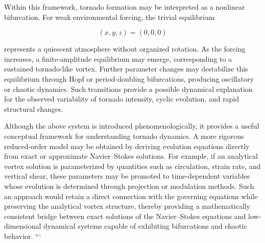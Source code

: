 Within this framework, tornado formation may be interpreted as a nonlinear bifurcation. For weak environmental forcing, the trivial equilibrium

\begin{equation}
(x,y,z)
=
(0,0,0)
\end{equation}

represents a quiescent atmosphere without organized rotation. As the forcing increases, a finite-amplitude equilibrium may emerge, corresponding to a sustained tornado-like vortex. Further parameter changes may destabilize this equilibrium through Hopf or period-doubling bifurcations, producing oscillatory or chaotic dynamics. Such transitions provide a possible dynamical explanation for the observed variability of tornado intensity, cyclic evolution, and rapid structural changes.

Although the above system is introduced phenomenologically, it provides a useful conceptual framework for understanding tornado dynamics. A more rigorous reduced-order model may be obtained by deriving evolution equations directly from exact or approximate Navier--Stokes solutions. For example, if an analytical vortex solution is parameterized by quantities such as circulation, strain rate, and vertical shear, these parameters may be promoted to time-dependent variables whose evolution is determined through projection or modulation methods. Such an approach would retain a direct connection with the governing equations while preserving the analytical vortex structure, thereby providing a mathematically consistent bridge between exact solutions of the Navier--Stokes equations and low-dimensional dynamical systems capable of exhibiting bifurcations and chaotic behavior.
```
